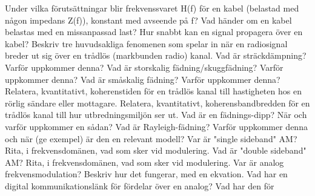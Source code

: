 \documentclass[a4paper,11pt]{article}
\begin{document}
\newline
Under vilka förutsättningar blir frekvenssvaret H(f) för en kabel (belastad med någon 
impedans Z(f)), konstant med avseende på f?
\newline
\newline
Vad händer om en kabel belastas med en missanpassad last?
\newline
\newline
Hur snabbt kan en signal propagera över en kabel?
\newline
\newline
Beskriv tre huvudsakliga fenomenen som spelar in när en radiosignal breder ut sig över en 
trådlös (markbunden radio) kanal.
\newline
\newline
Vad är sträckdämpning? Varför uppkommer denna?
\newline
\newline
Vad är storskalig fädning/skuggfädning? Varför uppkommer denna?
\newline
\newline
Vad är småskalig fädning? Varför uppkommer denna?
\newline
\newline
Relatera, kvantitativt, koherenstiden för en trådlös kanal till hastigheten hos en rörlig
sändare eller mottagare.
\newline
\newline
Relatera, kvantitativt, koherensbandbredden för en trådlös kanal till hur 
utbredningsmiljön ser ut.
\newline
\newline
Vad är en fädnings-dipp? När och varför uppkommer en sådan?
\newline
\newline
Vad är Rayleigh-fädning? Varför uppkommer denna och när (ge exempel) är den en 
relevant modell? 
\newline
\newline
Var är "single sideband" AM? Rita, i frekvensdomänen, vad som sker vid 
modulering.
\newline
\newline
Vad är "double sideband" AM? Rita, i frekvensdomänen, vad som sker vid 
modulering.
\newline
\newline
Var är analog frekvensmodulation? Beskriv hur det fungerar, med en ekvation.
\newline
\newline
Vad har en digital kommunikationslänk för fördelar över en analog? Vad har den för 
\end{document}
